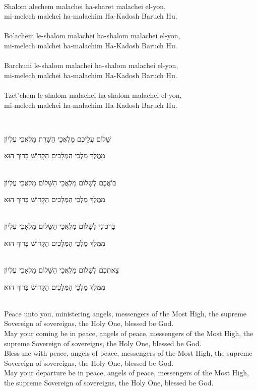 \documentclass[letterpaper,10pt]{article}
\newenvironment{HgEnglish}{\strut\\\noindent}{\vspace{1em}}
\newenvironment{HgTranslit}{\strut\\\noindent\begin{itshape}}{\end{itshape}\vspace{1em}}
\newenvironment{HgHebrew}{\begin{hebrew}\strut\\\noindent\LARGE}{\end{hebrew}}
\newlength{\translitSkip}
\newcommand{\blankLineTranslit}{\\[-0.5pt]}
\newcommand{\blankLine}{\\[6pt]}
\begin{document}
\noindent
\begin{minipage}[t]{.5\linewidth}
\begin{HgTranslit}
Shalom alechem malachei ha-sharet malachei el-yon, \\[\translitSkip]
mi-melech malchei ha-malachim Ha-Kadosh Baruch Hu. \\[\translitSkip]
\blankLineTranslit
Bo'achem le-shalom malachei ha-shalom malachei el-yon, \\[\translitSkip]
mi-melech malchei ha-malachim Ha-Kadosh Baruch Hu. \\[\translitSkip]
\blankLineTranslit
Barchuni le-shalom malachei ha-shalom malachei el-yon, \\[\translitSkip]
mi-melech malchei ha-malachim Ha-Kadosh Baruch Hu. \\[\translitSkip]
\blankLineTranslit
Tzet'chem le-shalom malachei ha-shalom malachei el-yon, \\[\translitSkip]
mi-melech malchei ha-malachim Ha-Kadosh Baruch Hu. \\[\translitSkip]
\end{HgTranslit}
\end{minipage}
\begin{minipage}[t]{.5\linewidth}
\vspace{-5mm}
\begin{HgHebrew}
\strut שָׁלוֹם עֲלֵיכֶם מַלְאֲכֵי הַשָּׁרֵת מַלְאֲכֵי עֶלְיוֹן \\
\strut מִמֶּלֶךְ מַלְכֵי הַמְּלָכִים הַקָּדוֹשׁ בָּרוּךְ הוּא \\
\blankLine
\strut בּוֹאֲכֶם לְשָׁלוֹם מַלְאֲכֵי הַשָּׁלוֹם מַלְאֲכֵי עֶלְיוֹן \\
\strut מִמֶּלֶךְ מַלְכֵי הַמְּלָכִים הַקָּדוֹשׁ בָּרוּךְ הוּא \\
\blankLine
\strut בָּרְכוּנִי לְשָׁלוֹם מַלְאֲכֵי הַשָּׁלוֹם מַלְאָכֵי עֶלְיוֹן \\
\strut מִמֶּלֶךְ מַלְכֵי הַמְּלָכִים הַקָּדוֹשׁ בָּרוּךְ הוּא \\
\blankLine
\strut צֵאתְכֶם לְשָׁלוֹם מַלְאֲכֵי הַשָּׁלוֹם מַלְאָכֵי עֶלְיוֹן \\
\strut מִמֶּלֶךְ מַלְכֵי הַמְּלָכִים הַקָּדוֹשׁ בָּרוּךְ הוּא \\
\end{HgHebrew}
\end{minipage}

\noindent
\begin{HgEnglish}
Peace unto you, ministering angels, messengers of the Most High, the supreme Sovereign of sovereigns, the Holy One, blessed be God. \\
May your coming be in peace, angels of peace, messengers of the Most High, the supreme Sovereign of sovereigns, the Holy One, blessed be God. \\
Bless me with peace, angels of peace, messengers of the Most High, the supreme Sovereign of sovereigns, the Holy One, blessed be God. \\
May your departure be in peace, angels of peace, messengers of the Most High, the supreme Sovereign of sovereigns, the Holy One, blessed be God. \\
\end{HgEnglish}
\end{document}
